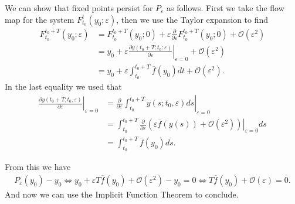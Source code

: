 \begin{remark}[]
	We can show that fixed points persist for $P_\varepsilon$ as follows. First we take the flow map for the system $F_{t_0}^{t}(y_0;\varepsilon)$, then we use the Taylor expansion to find
	\begin{subequations}
	\begin{align}
		F_{t_0}^{t_0+T}(y_0; \varepsilon) &= F_{t_0}^{t_0+T}(y_0;0) + \varepsilon \frac{\partial}{\partial \varepsilon}F_{t_0}^{t_0 + T}(y_0;0)+ \mathcal{O}(\varepsilon^2) \\
						  &= y_0 + \varepsilon  \left.\frac{\partial y(t_0+T;t_0;\varepsilon)}{\partial \varepsilon} \right|_{\varepsilon=0} + \mathcal{O}(\varepsilon^2) \\
						  &= y_0 + \varepsilon \int_{t_0}^{t_0 +T} \overline{f}(y_0)dt + \mathcal{O}(\varepsilon^2) .
	\end{align}
\end{subequations}
	In the last equality we used that
	\begin{subequations}
	\begin{align}
		\left.\frac{ \partial y(t_0 + T; t_0, \varepsilon)}{\partial \varepsilon}\right|_{\varepsilon = 0} &=
			\left. \frac{\partial}{\partial \varepsilon} \int_{t_0}^{t_0+T} \dot{y}(s;t_0,\varepsilon)ds \right|_{\varepsilon=0} \\
		 &=\int_{t_0}^{t_0 +T} \left.\frac{\partial}{\partial \varepsilon } \left( \varepsilon \overline{f}(y(s)) + \mathcal{O}(\varepsilon^2)\right) \right|_{\varepsilon=0} ds \\
		 &= \int_{t_0}^{t_0 + T} \overline{f}(y_0) ds.
	\end{align}
\end{subequations}
	
From this we have
\begin{align}
	P_{\varepsilon}(y_0) - y_0 \Leftrightarrow y_0 +\varepsilon T \overline{f}(y_0) + \mathcal{O}(\varepsilon^2) - y_0=0 \Leftrightarrow  T \overline{f}(y_0) + \mathcal{O}(\varepsilon) = 0.
\end{align}
And now we can use the Implicit Function Theorem to conclude.
\end{remark}

